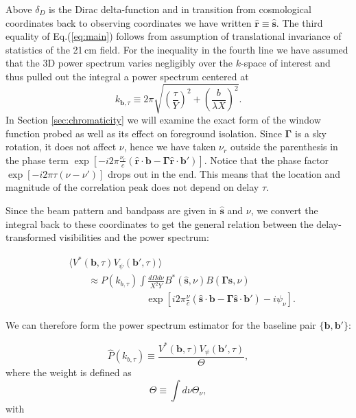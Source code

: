 \documentclass[twocolumn,apj,numberedappendix]{emulateapj}
\renewcommand\[{\begin{equation}}
\renewcommand\]{\end{equation}}
\begin{document}
Above $\delta_D$ is the Dirac delta-function and in transition from cosmological coordinates back to observing coordinates we have written $\hat{\boldsymbol{r}}\equiv\hat{\boldsymbol{s}}$. The third equality of Eq.(\ref{eq:main}) follows from assumption of translational invariance of statistics of the 21\,cm field. 
For the inequality in the fourth line we have assumed that the  3D power spectrum varies negligibly over the $k$-space of interest and thus pulled out the integral a power spectrum centered at 
\[
k_{\boldsymbol{b}, \tau} \equiv 2\pi \sqrt{\left(\frac{\tau}{Y}\right)^2 + \left(\frac{b}{\lambda X}\right)^2}. 
\label{eq:kbtau}
\]
In Section \ref{sec:chromaticity} we will examine the exact form of the window function probed as well as its effect on foreground isolation.  Since $\boldsymbol{\Gamma}$
is a sky rotation, it does not affect $\nu$, hence we have taken $\nu_{r}$
outside the parenthesis in the phase term $\exp\left[-i2\pi\frac{\nu_{r}}{c}\left(\hat{\boldsymbol{r}}\cdot\boldsymbol{b}-\boldsymbol{\Gamma} \hat{\boldsymbol{r}}\cdot\boldsymbol{b'}\right)\right]$. Notice that the phase factor $\exp\left[-i2\pi\tau\left(\nu-\nu'\right)\right]$
drops out in the end. This means that the location and magnitude of the correlation peak does not depend on delay $\tau$. 

Since the beam pattern and bandpass are given in $\hat{\boldsymbol{s}}$
and $\nu$, we convert the integral back to these coordinates to get
the general relation between the delay-transformed visibilities and
the power spectrum:

\begin{equation}
\begin{aligned} & \langle V^{*}(\boldsymbol{b},\tau)V_{\psi}(\boldsymbol{b'},\tau)\rangle\\
 & \qquad \approx P(k_{b,\tau})\int\frac{d\Omega d\nu}{X^{2}Y}B^{*}(\hat{\boldsymbol{s}},\nu)B(\boldsymbol{\Gamma}\hat{\boldsymbol{s}},\nu)\\
 & \qquad \qquad \qquad \qquad \exp\left[i2\pi\frac{\nu}{c}\left(\hat{\boldsymbol{s}}\cdot\boldsymbol{b}-\boldsymbol{\Gamma}\hat{\boldsymbol{s}}\cdot\boldsymbol{b'}\right)-i\psi_{\nu}\right].
 \end{aligned}
\label{eq:final}
\end{equation}

We can therefore form the power spectrum estimator for the baseline pair $\{\boldsymbol b, \boldsymbol  b'\}$:
 
\begin{equation}
 \hat{P}(k_{b,\tau}) \equiv \frac{V^{*}(\boldsymbol{b},\tau)V_{\psi}(\boldsymbol{b'},\tau)}{\Theta}, 
 \label{eq:opp}
\end{equation}
where the weight is defined as 
\begin{equation}
\Theta \equiv\int d\nu \Theta_{\nu}, 
\label{eq:Theta}
\end{equation}
with  
\end{document}
